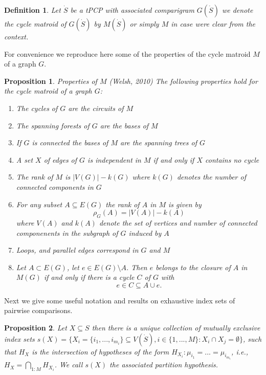 \documentclass[a4paper,12pt]{article}
\newtheorem{definition}{Definition}
\newtheorem{proposition}{Proposition}
\newcommand{\ie}{{\em i.e.,}~}
\begin{document}
\begin{definition}
  Let $\dot{S}$ be a tPCP with associated comparigram $G(\dot{S})$ we
  denote the cycle matroid of $G(\dot{S})$ by $M(\dot{S})$ or simply
  $M$ in case were clear from the context. 
\end{definition}

For convenience we reproduce here some of the properties of the cycle
matroid $M$ of a graph $G$. 

\begin{proposition}{Properties of $M$ (Welsh, 2010)}
  The following properties hold for the cycle matroid of a graph $G$:
  \begin{enumerate}
  \item The cycles of $G$ are the circuits of $M$ 
  \item The spanning forests of $G$ are the bases of $M$
  \item If $G$ is connected the bases of $M$ are the spanning trees of $G$
  \item A set $X$ of edges of $G$ is independent in $M$ if and only if
    $X$ contains no cycle
  \item The rank of $M$ is $|V(G)| - k(G)$ where $k(G)$ denotes the
    number of connected components in $G$
  \item For any subset $A \subseteq E(G)$ the rank of $A$ in $M$ is
    given by
    \begin{displaymath}
      \rho_G(A) = |V(A)| - k(A)
    \end{displaymath}
    where $V(A)$ and $k(A)$ denote the set of vertices and number of
    connected componenents in the subgraph of $G$ induced by $A$
  \item Loops, and parallel edges correspond in $G$ and $M$
  \item Let $A \subset E(G)$, let $e \in E(G)\setminus A$. Then $e$
    belongs to the closure of $A$ in $M(G)$ if and only if there is a
    cycle $C$ of $G$ with
    \begin{displaymath}
      e \in C \subseteq A \cup e.
    \end{displaymath}

  \end{enumerate}
\label{the:cyclemat}
\end{proposition}

Next we give some useful notation and results on exhaustive index sets
of pairwise comparisons.

\begin{proposition}
  Let $X \subseteq S$ then there is a unique collection of mutually
  exclusive index sets $s(X) = \{X_i = \{i_1,...,i_{m_i}\} \subseteq
  V(\dot{S}), i \in \{1,...,M\}: X_i \cap X_j = \emptyset\}$, such
  that $H_X$ is the intersection of hypotheses of the form $H_{X_i}:
  \mu_{i_1} = ... = \mu_{i_{m_i}}$, \ie $H_X = \bigcap_{1:M}
  H_{X_i}$. We call $s(X)$ the {\em associated partition hypothesis}.
\end{proposition}
\end{document}
